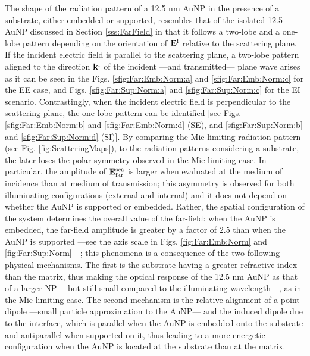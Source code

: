 The shape of the radiation pattern of a 12.5 nm AuNP in the presence of a substrate, either embedded or supported, resembles that of the isolated 12.5 AuNP discussed in Section \ref{sss:FarField} in that it follows a two-lobe and a one-lobe pattern depending on the orientation of $\vb{E}^\text{i}$ relative to the scattering plane. If the incident electric field is parallel to the scattering plane, a two-lobe pattern aligned to the direction $\vb{k}^\text{i}$ of the incident ---and transmitted--- plane wave arises as it can be seen in the Figs. \ref{sfig:Far:Emb:Norm:a} and  \ref{sfig:Far:Emb:Norm:c} for the EE case, and Figs.  \ref{sfig:Far:Sup:Norm:a} and \ref{sfig:Far:Sup:Norm:c} for the EI scenario. Contrastingly, when the incident electric field is perpendicular to the scattering plane, the one-lobe pattern can be identified [see Figs. \ref{sfig:Far:Emb:Norm:b} and \ref{sfig:Far:Emb:Norm:d} (SE), and \ref{sfig:Far:Sup:Norm:b} and \ref{sfig:Far:Sup:Norm:d} (SI)]. By comparing the Mie-limiting radiation pattern (see Fig. \ref{fig:ScatteringMaps}), to the radiation patterns considering a substrate, the later loses the polar symmetry observed in the Mie-limiting case.  In particular, the amplitude of $\vb{E}^\text{sca}_\text{far}$ is larger when evaluated at the medium of incidence  than at medium of transmission; this asymmetry is observed for both illuminating configurations (external and internal) and it does not depend on whether the AuNP is supported or embedded. Rather, the spatial configuration of the system determines the overall value of the far-field: when the AuNP is embedded, the far-field amplitude is greater by a factor of $2.5$  than when the AuNP is supported ---see the axis scale in Figs. \ref{fig:Far:Emb:Norm} and \ref{fig:Far:Sup:Norm}---; this phenomena  is a consequence of the two following physical mechanisms. The first is the substrate having a greater refractive index than the matrix, thus making the optical response of the 12.5 nm AuNP as that of a larger NP ---but still small compared to the illuminating wavelength---, as in the Mie-limiting case. The second mechanism is the relative alignment of a point dipole ---small particle approximation to the AuNP--- and the induced dipole due to the interface, which is parallel when the AuNP is embedded onto the substrate and antiparallel when supported on it, thus leading to a more energetic configuration when the AuNP is located at the substrate than at the matrix.

